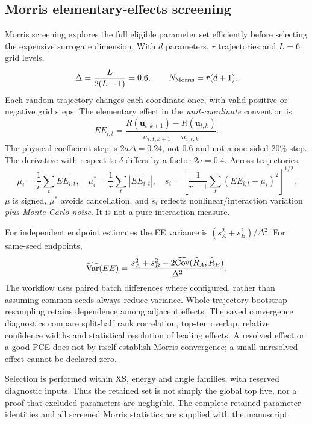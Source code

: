 \subsection{Morris elementary-effects screening}
Morris screening \citep{morris} explores the full eligible parameter set efficiently before selecting the expensive surrogate dimension. With $d$ parameters, $r$ trajectories and $L=6$ grid levels,
\begin{equation}
\Delta=\frac{L}{2(L-1)}=0.6,\qquad N_{\rm Morris}=r(d+1).\label{eq:morriscost}
\end{equation}
Each random trajectory changes each coordinate once, with valid positive or negative grid steps. The elementary effect in the \emph{unit-coordinate} convention is
\begin{equation}
EE_{i,t}=\frac{R(\bm u_{t,k+1})-R(\bm u_{t,k})}{u_{i,t,k+1}-u_{i,t,k}}.\label{eq:ee}
\end{equation}
The physical coefficient step is $2a\Delta=0.24$, not 0.6 and not a one-sided 20\% step. The derivative with respect to $\delta$ differs by a factor $2a=0.4$. Across trajectories,
\begin{equation}
\mu_i=\frac1r\sum_tEE_{i,t},\quad
\mu_i^*=\frac1r\sum_t|EE_{i,t}|,\quad
s_i=\left[\frac1{r-1}\sum_t(EE_{i,t}-\mu_i)^2\right]^{1/2}.\label{eq:morrisstats}
\end{equation}
$\mu$ is signed, $\mu^*$ avoids cancellation, and $s_i$ reflects nonlinear/interaction variation \emph{plus Monte Carlo noise}. It is not a pure interaction measure.

For independent endpoint estimates the EE variance is $(s_A^2+s_B^2)/\Delta^2$. For same-seed endpoints,
\begin{equation}
\widehat{\operatorname{Var}}(EE)=\frac{s_A^2+s_B^2-2\widehat{\operatorname{Cov}}(\widehat R_A,\widehat R_B)}{\Delta^2}.\label{eq:eenoise}
\end{equation}
The workflow uses paired batch differences where configured, rather than assuming common seeds always reduce variance. Whole-trajectory bootstrap resampling retains dependence among adjacent effects. The saved convergence diagnostics compare split-half rank correlation, top-ten overlap, relative confidence widths and statistical resolution of leading effects. A resolved effect or a good PCE does not by itself establish Morris convergence; a small unresolved effect cannot be declared zero.

Selection is performed within XS, energy and angle families, with reserved diagnostic inputs. Thus the retained set is not simply the global top five, nor a proof that excluded parameters are negligible. The complete retained parameter identities and all screened Morris statistics are supplied with the manuscript.

